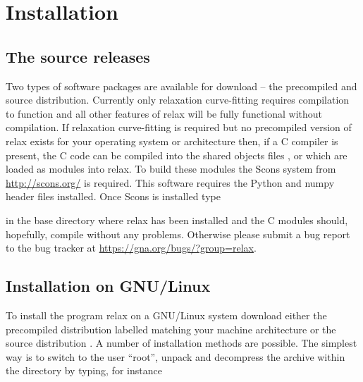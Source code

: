 
\section{Installation}


\subsection{The source releases}
\label{sect: source releases}

Two types of software packages are available for download -- the precompiled and source distribution.  Currently only relaxation curve-fitting requires compilation to function and all other features of relax will be fully functional without compilation.  If relaxation curve-fitting is required but no precompiled version of relax exists for your operating system or architecture then, if a C compiler is present, the C code can be compiled into the shared objects files ,  or  which are loaded as modules into relax.  To build these modules the Scons system from \href{http://scons.org/}{http://scons.org/} is required.  This software requires the Python and numpy header files installed.  Once Scons is installed type


in the base directory where relax has been installed and the C modules should, hopefully, compile without any problems.  Otherwise please submit a bug report to the bug tracker at \href{https://gna.org/bugs/?group=relax}{https://gna.org/bugs/?group=relax}.



\subsection{Installation on GNU/Linux}

To install the program relax on a GNU/Linux system download either the precompiled distribution labelled  matching your machine architecture or the source distribution .  A number of installation methods are possible.  The simplest way is to switch to the user ``root'', unpack and decompress the archive within the  directory by typing, for instance

